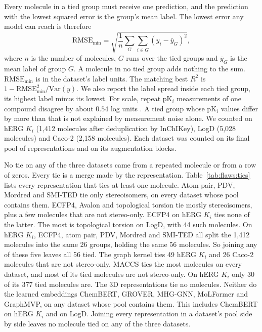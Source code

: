 Every molecule in a tied group must receive one prediction, and the prediction with the lowest squared error is the group's mean label. The lowest error any model can reach is therefore
\begin{equation}
\mathrm{RMSE}_{\min} = \sqrt{\frac{1}{n}\sum_{G}\sum_{i \in G}\left(y_i - \bar{y}_G\right)^2},
\end{equation}
where $n$ is the number of molecules, $G$ runs over the tied groups and $\bar{y}_G$ is the mean label of group $G$. A molecule in no tied group adds nothing to the sum. $\mathrm{RMSE}_{\min}$ is in the dataset's label units. The matching best $R^2$ is $1 - \mathrm{RMSE}_{\min}^2 / \mathrm{Var}(y)$. We also report the label spread inside each tied group, its highest label minus its lowest. For scale, repeat pK$_i$ measurements of one compound disagree by about $0.54$ log units \citep{Kramer2012}. A tied group whose pK$_i$ values differ by more than that is not explained by measurement noise alone. We counted on hERG $K_i$ (1,412 molecules after deduplication by InChIKey), LogD (5,028 molecules) and Caco-2 (2,158 molecules). Each dataset was counted on its final pool of representations and on its augmentation blocks.

No tie on any of the three datasets came from a repeated molecule or from a row of zeros. Every tie is a merge made by the representation. Table~\ref{tab:flaws:ties} lists every representation that ties at least one molecule. Atom pair, PDV, Mordred and SMI-TED tie only stereoisomers, on every dataset whose pool contains them. ECFP4, Avalon and topological torsion tie mostly stereoisomers, plus a few molecules that are not stereo-only. ECFP4 on hERG $K_i$ ties none of the latter. The most is topological torsion on LogD, with 44 such molecules. On hERG $K_i$, ECFP4, atom pair, PDV, Mordred and SMI-TED all split the 1,412 molecules into the same 26 groups, holding the same 56 molecules. So joining any of these five leaves all 56 tied. The graph kernel ties 49 hERG $K_i$ and 26 Caco-2 molecules that are not stereo-only. MACCS ties the most molecules on every dataset, and most of its tied molecules are not stereo-only. On hERG $K_i$ only 30 of its 377 tied molecules are. The 3D representations tie no molecules. Neither do the learned embeddings ChemBERT, GROVER, MHG-GNN, MoLFormer and GraphMVP, on any dataset whose pool contains them. %
This includes ChemBERT on hERG $K_i$ and on LogD. Joining every representation in a dataset's pool side by side leaves no molecule tied on any of the three datasets.


